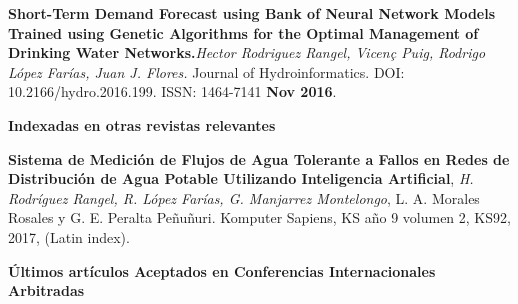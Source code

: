 \documentclass[10pt]{article}
\newenvironment{innerlist}[1][\enskip\textbullet]%
        {\begin{compactitem}[#1]}{\end{compactitem}}
\begin{document}
\begin{innerlist}
\item \textbf{Short-Term Demand Forecast using Bank of Neural Network Models Trained using Genetic Algorithms for the Optimal Management of Drinking Water Networks.}\textit{Hector Rodriguez Rangel, Vicen\c{c} Puig, Rodrigo López Farías, Juan J. Flores.}  {Journal of Hydroinformatics}. DOI: 10.2166/hydro.2016.199. ISSN: 1464-7141 \textbf{Nov 2016}.





\end{innerlist}



\textbf{Indexadas en otras revistas relevantes }
\begin{innerlist}
\item \textbf{Sistema de Medición de Flujos de Agua Tolerante a Fallos en Redes de Distribución de Agua Potable Utilizando Inteligencia Artificial}, \textit{H. Rodríguez Rangel, R. López Farías, G. Manjarrez Montelongo}, L. A. Morales Rosales y G. E. Peralta Peñuñuri. Komputer Sapiens, KS año 9 volumen 2, KS92, 2017, (Latin index).
\end{innerlist}







\textbf{Últimos artículos Aceptados en Conferencias Internacionales Arbitradas}
\end{document}
